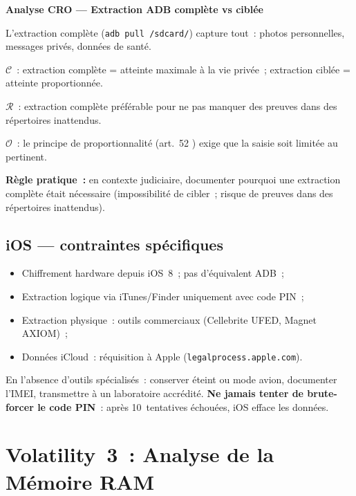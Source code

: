 \begin{boxCRO}
\textbf{Analyse CRO --- Extraction ADB complète vs ciblée}

L'extraction complète (\texttt{adb pull /sdcard/}) capture tout~:
photos personnelles, messages privés, données de santé.

$\mathcal{C}$~: extraction complète = atteinte maximale à la vie privée~;
extraction ciblée = atteinte proportionnée.

$\mathcal{R}$~: extraction complète préférable pour ne pas manquer
des preuves dans des répertoires inattendus.

$\mathcal{O}$~: le principe de proportionnalité (art.~52
) exige que la saisie soit limitée au pertinent.


\textbf{Règle pratique~:} en contexte judiciaire, documenter pourquoi
une extraction complète était nécessaire (impossibilité de cibler~;
risque de preuves dans des répertoires inattendus).
\end{boxCRO}

\subsection{iOS --- contraintes spécifiques}

\begin{itemize}
    \item Chiffrement hardware depuis iOS~8~; pas d'équivalent ADB~;
    \item Extraction logique via iTunes/Finder uniquement avec code PIN~;
    \item Extraction physique~: outils commerciaux (Cellebrite UFED,
          Magnet AXIOM)~;
    \item Données iCloud~: réquisition à Apple
          (\texttt{legalprocess.apple.com}).
\end{itemize}

En l'absence d'outils spécialisés~: conserver éteint ou mode avion,
documenter l'IMEI, transmettre à un laboratoire accrédité.
\textbf{Ne jamais tenter de brute-forcer le code PIN}~: après
10~tentatives échouées, iOS efface les données.

\section{Volatility~3~: Analyse de la Mémoire RAM}
\label{sec:volatility}

